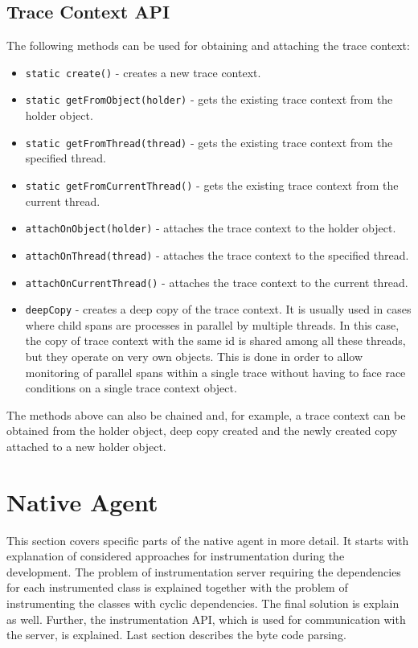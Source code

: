 \subsection{Trace Context API}
\label{imp:trace_context_api}
The following methods can be used for obtaining and attaching the trace context:
\begin{itemize}
	\item \texttt{static create()} - creates a new trace context.
	\item \texttt{static getFromObject(holder)} - gets the existing trace context from the holder object.
	\item \texttt{static getFromThread(thread)} - gets the existing trace context from the specified thread.
	\item \texttt{static getFromCurrentThread()} -  gets the existing trace context from the current thread.
	\item \texttt{attachOnObject(holder)} - attaches the trace context to the holder object.
	\item \texttt{attachOnThread(thread)} - attaches the trace context to the specified \newline thread.
	\item \texttt{attachOnCurrentThread()} - attaches the trace context to the current \newline thread.
	\item \texttt{deepCopy} - creates a deep copy of the trace context. It is usually used in cases where child spans are processes in parallel by multiple threads. In this case, the copy of trace context with the same id is shared among all these threads, but they operate on very own objects. This is done in order to allow monitoring of parallel spans within a single trace without having to face race conditions on a single trace context object.
\end{itemize}

The methods above can also be chained and, for example, a trace context can be obtained from the holder object, deep copy created and the newly created copy attached to a new holder object.


\section{Native Agent}
This section covers specific parts of the native agent in more detail. It starts with explanation of considered approaches for instrumentation during the development. The problem of instrumentation server requiring the dependencies for each instrumented class is explained together with the problem of instrumenting the classes with cyclic dependencies. The final solution is explain as well. Further, the instrumentation API, which is used for communication with the server, is explained. Last section describes the byte code parsing.
